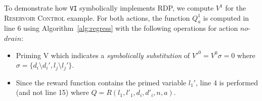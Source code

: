 To demonstrate how \texttt{VI} symbolically implements RDP, we compute $V^1$ for the \textsc{Reservoir Control} example. For both actions, the function $Q^1_a$ is computed in line 6 using Algorithm~\ref{alg:regress} with the following operations for action $\mathit{no}$-$\mathit{drain}$:
\begin{itemize}

\item Priming V which %
indicates a \emph{symbolically substitution} of  $V'^0= V^0 \sigma = 0$ where $\sigma = \lbrace d_i \setminus d_i' , l_j \setminus l_j' \rbrace$.%

\item Since the reward function contains the primed variable $l_1'$, line 4 is performed (and not line 15) where $Q = R(l_1,l'_1,d_i,d'_i,n,a) $. 


\end{itemize}
